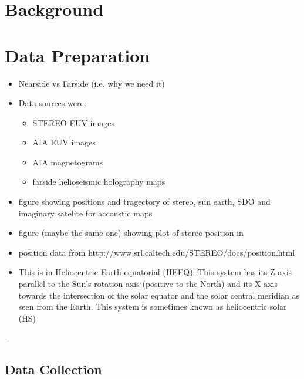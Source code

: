 \documentclass[11pt,a4paper,onecolumn]{report}
\begin{document}
%
%
%
%
\chapter{Background}
%
%
%
%








%
%
%
%
\chapter{Data Preparation}
%
%
%
%




\begin{itemize}
  \item Nearside vs Farside (i.e. why we need it)
  \item Data sources were:
  \begin{itemize}
    \item STEREO EUV images
    \item AIA EUV images
    \item AIA magnetograms
    \item farside helioseismic holography maps
  \end{itemize} 
  \item figure showing positions and tragectory of stereo, sun earth, SDO and
  imaginary satelite for accoustic maps
  \item figure (maybe the same one) showing plot of stereo position in
  \item position data from http://www.srl.caltech.edu/STEREO/docs/position.html
  \item This is in Heliocentric Earth equatorial (HEEQ): This system has its Z axis
  parallel to the Sun's rotation axis (positive to the North) and its X axis
  towards the intersection of the solar equator and the solar central meridian as
  seen from the Earth. This system is sometimes known as heliocentric solar (HS)
\end{itemize}

- 

\section{Data Collection}
\end{document}
